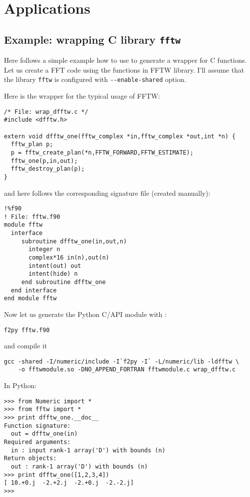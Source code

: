 
\section{Applications}
\label{sec:apps}


\subsection{Example: wrapping C library \texttt{fftw}}
\label{sec:wrapfftw}

Here follows a simple example how to use \fpy to generate a wrapper
for C functions. Let us create a FFT code using the functions in FFTW
library. I'll assume that the library \texttt{fftw} is configured with
\texttt{-{}-enable-shared} option. 

Here is the wrapper for the typical usage of FFTW:
\begin{verbatim}
/* File: wrap_dfftw.c */
#include <dfftw.h>

extern void dfftw_one(fftw_complex *in,fftw_complex *out,int *n) {
  fftw_plan p;
  p = fftw_create_plan(*n,FFTW_FORWARD,FFTW_ESTIMATE);
  fftw_one(p,in,out);
  fftw_destroy_plan(p);
}
\end{verbatim}
and here follows the corresponding signature file (created manually):
\begin{verbatim}
!%f90
! File: fftw.f90
module fftw
  interface
     subroutine dfftw_one(in,out,n)
       integer n
       complex*16 in(n),out(n)
       intent(out) out
       intent(hide) n
     end subroutine dfftw_one
  end interface
end module fftw
\end{verbatim}

Now let us generate the Python C/API module with \fpy:
\begin{verbatim}
f2py fftw.f90
\end{verbatim}
and compile it
\begin{verbatim}
gcc -shared -I/numeric/include -I`f2py -I` -L/numeric/lib -ldfftw \
    -o fftwmodule.so -DNO_APPEND_FORTRAN fftwmodule.c wrap_dfftw.c
\end{verbatim}

In Python:
\begin{verbatim}
>>> from Numeric import *
>>> from fftw import *
>>> print dfftw_one.__doc__
Function signature:
  out = dfftw_one(in)
Required arguments:
  in : input rank-1 array('D') with bounds (n)
Return objects:
  out : rank-1 array('D') with bounds (n)
>>> print dfftw_one([1,2,3,4])
[ 10.+0.j  -2.+2.j  -2.+0.j  -2.-2.j]
>>> 
\end{verbatim}

